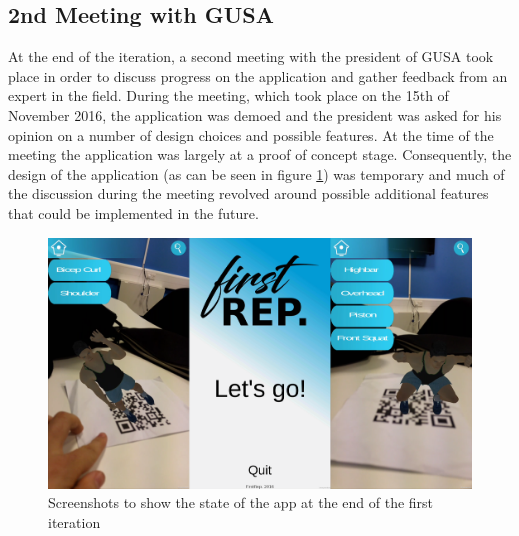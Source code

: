\documentclass{l4proj}
\begin{document}
\subsection{2nd Meeting with GUSA}
At the end of the iteration, a second meeting with the president of GUSA took place in order to discuss progress on the application and gather feedback from an expert in the field. During the meeting, which took place on the 15th of November 2016, the application was demoed and the president was asked for his opinion on a number of design choices and possible features. At the time of the meeting the application was largely at a proof of concept stage. Consequently, the design of the application (as can be seen in figure \ref{fig:it1}) was temporary and much of the discussion during the meeting revolved around possible additional features that could be implemented in the future. 

\begin{figure}[h]
\centering
\includegraphics[width=\textwidth]{images/iteration1_screenshots.png}
\caption{Screenshots to show the state of the app at the end of the first iteration}
\label{fig:it1}
\end{figure}
\end{document}

